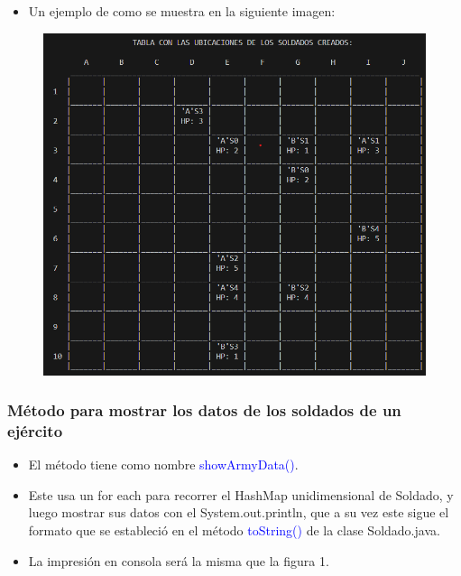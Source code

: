 \documentclass{article}
\begin{document}
\begin{itemize}\begin{itemize}\item Un ejemplo de como se muestra en la siguiente imagen:
\end{itemize}\end{itemize}
\begin{figure}[H]
    \centering
    \includegraphics[width=1\textwidth,keepaspectratio]{img/showArmyTable.png}
    \caption{}
\end{figure}

\subsubsection{Método para mostrar los datos de los soldados de un ejército}
\begin{itemize}
    \item El método tiene como nombre \textcolor{blue}{showArmyData()}.
    \item Este usa un for each para recorrer el HashMap unidimensional de Soldado, y luego mostrar sus datos con el System.out.println, que a su vez este sigue el formato que se estableció en el método \textcolor{blue}{toString()} de la clase Soldado.java.
    \item La impresión en consola será la misma que la figura 1.
\end{itemize}

\end{document}
